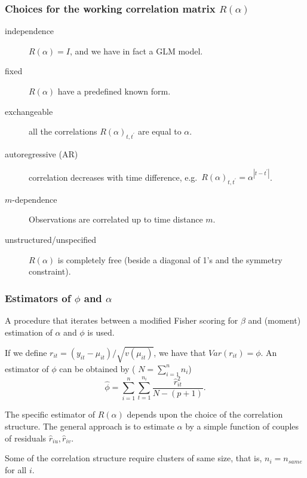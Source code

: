 \documentclass{beamer}
\newcommand{\bs}{\bigskip}
\newcommand{\sms}{\smallskip}
\begin{document}
\begin{frame}
\frametitle{Choices for the working correlation matrix $R(\alpha)$ }
\begin{description}
\item[{\color{blue}independence}] $R(\alpha)=I$, and we have in fact a
  GLM model.
\item[{\color{blue}fixed}] $R(\alpha)$ have a predefined known form.
\item[{\color{blue}exchangeable}] all the correlations $R(\alpha)_{t,t^\prime}$
are equal to $\alpha$. 
\item[{\color{blue}autoregressive (AR)}] correlation decreases with
  time difference, e.g.\ $R(\alpha)_{t,t^\prime} = \alpha^{|t-t^\prime|}$.
\item[{\color{blue}$m$-dependence}] Observations are correlated up to
  time distance $m$.
\item[{\color{blue}unstructured/unspecified}] $R(\alpha)$ is
  completely free (beside a diagonal of 1's and the symmetry constraint).
\end{description}
\end{frame}

\begin{frame}
\frametitle{Estimators of $\phi$ and $\alpha$}

A procedure that iterates between a
modified Fisher scoring for $\beta$ and (moment) estimation of
$\alpha$ and $\phi$ is used.

\bs
If we define $r_{it} = (y_{it} -
\mu_{it})/\sqrt{v(\mu_{it})}$, we have that
$Var(r_{it}) = \phi$.  An estimator of $\phi$ can be
obtained by  ( $N=\sum_{i=1}^n n_i$)
$$\hat{\phi} = \sum_{i=1}^n \sum_{t=1}^{n_i}
\frac{\hat{r}_{it}^2}{N-(p+1)}.$$

\sms
The specific estimator of $R(\alpha)$ depends upon the choice of the
correlation structure. The general approach is to estimate $\alpha$ by
a simple function of couples of residuals $\hat{r}_{iu}, \hat{r}_{iv}$.

\sms
Some of the correlation structure require clusters of same size, that
is, $n_i = n_{same}$ for all $i$.
\end{frame}
\end{document}
